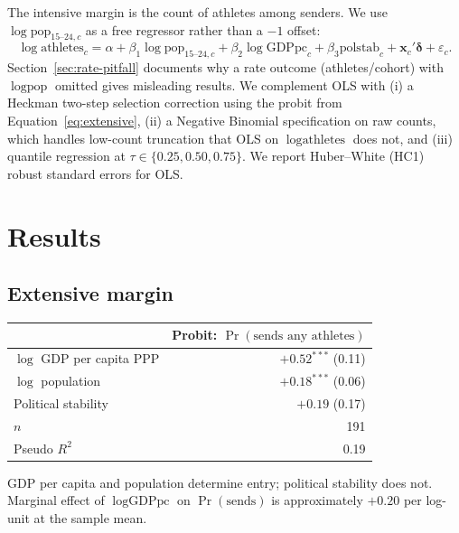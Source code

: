 \documentclass[11pt]{article}
\begin{document}
The intensive margin is the count of athletes among senders. We use
$\log\text{pop}_{15\text{--}24,c}$ as a free regressor rather than a
$-1$ offset:
\begin{equation}
\log\text{athletes}_c = \alpha
   + \beta_1 \log\text{pop}_{15\text{--}24,c}
   + \beta_2 \log\text{GDPpc}_c
   + \beta_3 \text{polstab}_c
   + \mathbf{x}_c' \boldsymbol{\delta} + \varepsilon_c.
\label{eq:intensive}
\end{equation}
Section~\ref{sec:rate-pitfall} documents why a rate outcome
(athletes/cohort) with
$\log\text{pop}$ omitted gives misleading results. We complement OLS
with (i) a Heckman two-step selection correction using the probit
from Equation~\ref{eq:extensive}, (ii) a Negative Binomial
specification on raw counts, which handles low-count truncation that
OLS on $\log\text{athletes}$ does not, and (iii) quantile regression
at $\tau \in \{0.25, 0.50, 0.75\}$. We report Huber--White (HC1)
robust standard errors for OLS.

\section{Results}

\subsection{Extensive margin}
\label{sec:extensive}

\begin{center}
\small
\begin{tabular}{lr}
\toprule
 & Probit: $\Pr(\text{sends any athletes})$ \\
\midrule
$\log$ GDP per capita PPP & $\mathbf{+0.52^{***}}$ (0.11) \\
$\log$ population         & $\mathbf{+0.18^{***}}$ (0.06) \\
Political stability       & $+0.19$ (0.17) \\
\midrule
$n$                       & 191 \\
Pseudo $R^2$              & 0.19 \\
\bottomrule
\end{tabular}
\end{center}

GDP per capita and population determine entry; political stability
does not. Marginal effect of $\log\text{GDPpc}$ on $\Pr(\text{sends})$
is approximately $+0.20$ per log-unit at the sample mean.
\end{document}
